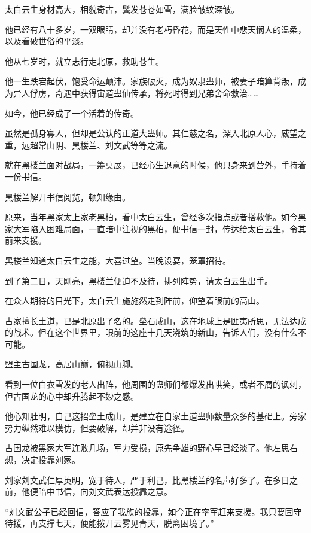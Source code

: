
\begin{this_body}



太白云生身材高大，相貌奇古，鬓发苍苍如雪，满脸皱纹深皱。

他已经有八十多岁，一双眼睛，却并没有老朽昏花，而是天性中悲天悯人的温柔，以及看破世俗的平淡。

他从七岁时，就立志行走北原，救助苍生。

他一生跌宕起伏，饱受命运颠沛。家族破灭，成为奴隶蛊师，被妻子暗算背叛，成为异人俘虏，奇遇中获得宙道蛊仙传承，将死时得到兄弟舍命救治……

如今，他已经成了一个活着的传奇。

虽然是孤身寡人，但却是公认的正道大蛊师。其仁慈之名，深入北原人心，威望之重，远超常山阴、黑楼兰、刘文武等等之流。

就在黑楼兰面对战局，一筹莫展，已经心生退意的时候，他只身来到营外，手持着一份书信。

黑楼兰解开书信阅览，顿知缘由。

原来，当年黑家太上家老黑柏，看中太白云生，曾经多次指点或者搭救他。如今黑家大军陷入困难局面，一直暗中注视的黑柏，便书信一封，传达给太白云生，令其前来支援。

黑楼兰知道太白云生之能，大喜过望。当晚设宴，笼罩招待。

到了第二日，天刚亮，黑楼兰便迫不及待，排列阵势，请太白云生出手。

在众人期待的目光下，太白云生施施然走到阵前，仰望着眼前的高山。

古家擅长土道，已是北原出了名的。垒石成山，这在地球上是匪夷所思，无法达成的战术。但在这个世界里，眼前的这座十几天浇筑的新山，告诉人们，没有什么不可能。

盟主古国龙，高居山巅，俯视山脚。

看到一位白衣雪发的老人出阵，他周围的蛊师们都爆发出哄笑，或者不屑的讽刺，但古国龙的心中却升腾起不妙之感。

他心知肚明，自己这招垒土成山，是建立在自家土道蛊师数量众多的基础上。旁家势力纵然难以模仿，但要破解，却并非没有途径。

古国龙被黑家大军连败几场，军力受损，原先争雄的野心早已经淡了。他左思右想，决定投靠刘家。

刘家刘文武仁厚英明，宽于待人，严于利己，比黑楼兰的名声好多了。在多日之前，他便暗中书信，向刘文武表达投靠之意。

“刘文武公子已经回信，答应了我族的投靠，如今正在率军赶来支援。我只要固守待援，再支撑七天，便能拨开云雾见青天，脱离困境了。”


\end{this_body}
